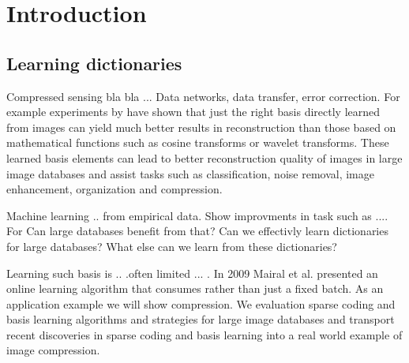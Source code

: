 \chapter{Introduction}
\label{sec:introduction}
\section{Learning dictionaries}


Compressed sensing bla bla ...
Data networks, data transfer, error correction. For example experiments by
\cite{} have shown that just the right basis directly learned from images can
yield much better results in reconstruction than those based on mathematical
functions such as cosine transforms or wavelet\cite{Elad2006,Mairal2010}
transforms. These learned basis elements can lead to better reconstruction
quality of images in large image databases and assist tasks such as
classification, noise removal, image enhancement, organization and compression. 

Machine learning .. from empirical data.
Show improvments in task such as ....
For 
Can large databases benefit from that? Can we effectivly learn dictionaries for
large databases? What else can we learn from these dictionaries?


Learning such basis is .. .often limited ... . In 2009 Mairal et
al.\cite{Mairal2009} presented an online learning algorithm that consumes 
rather than just a fixed batch. As an application example we will show
compression. We evaluation sparse coding and basis learning algorithms and
strategies for large image databases and transport recent discoveries in sparse
coding and basis learning into a real world example of image compression.

